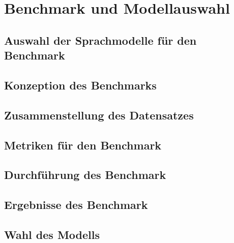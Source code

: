 \chapter{Benchmark und Modellauswahl}\label{ch:benchmark}

\section{Auswahl der Sprachmodelle für den Benchmark}\label{sec:modelle-benchmark}

\section{Konzeption des Benchmarks}\label{sec:konzeption-benchmark}

\section{Zusammenstellung des Datensatzes}\label{sec:datensatz-benchmark}

\section{Metriken für den Benchmark}\label{sec:metriken-benchmark}

\section{Durchführung des Benchmark}\label{sec:durchfuhrung-benchmark}

\section{Ergebnisse des Benchmark}\label{sec:ergebnisse-benchmark}

\section{Wahl des Modells}\label{sec:auswahl-modell-benchmark}